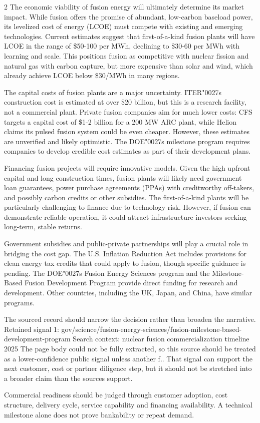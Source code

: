 \documentclass[10pt,a4paper]{article}
\newcommand{\BOApos}{{\BOQuoteFont\char"0027}}
\begin{document}
\begin{multicols}{2}
{\small The economic viability of fusion energy will ultimately determine its market impact. While fusion offers the promise of abundant, low-carbon baseload power, its levelized cost of energy (LCOE) must compete with existing and emerging technologies. Current estimates suggest that first-of-a-kind fusion plants will have LCOE in the range of \$50-100 per MWh, declining to \$30-60 per MWh with learning and scale. This positions fusion as competitive with nuclear fission and natural gas with carbon capture, but more expensive than solar and wind, which already achieve LCOE below \$30/MWh in many regions.}\par
{\small The capital costs of fusion plants are a major uncertainty. ITER\BOApos{}s construction cost is estimated at over \$20 billion, but this is a research facility, not a commercial plant. Private fusion companies aim for much lower costs: CFS targets a capital cost of \$1-2 billion for a 200 MW ARC plant, while Helion claims its pulsed fusion system could be even cheaper. However, these estimates are unverified and likely optimistic. The DOE\BOApos{}s milestone program requires companies to develop credible cost estimates as part of their development plans.}\par
{\small Financing fusion projects will require innovative models. Given the high upfront capital and long construction times, fusion plants will likely need government loan guarantees, power purchase agreements (PPAs) with creditworthy off-takers, and possibly carbon credits or other subsidies. The first-of-a-kind plants will be particularly challenging to finance due to technology risk. However, if fusion can demonstrate reliable operation, it could attract infrastructure investors seeking long-term, stable returns.}\par
{\small Government subsidies and public-private partnerships will play a crucial role in bridging the cost gap. The U.S. Inflation Reduction Act includes provisions for clean energy tax credits that could apply to fusion, though specific guidance is pending. The DOE\BOApos{}s Fusion Energy Sciences program and the Milestone-Based Fusion Development Program provide direct funding for research and development. Other countries, including the UK, Japan, and China, have similar programs.}\par
{\small The sourced record should narrow the decision rather than broaden the narrative. Retained signal 1: gov/science/fusion-energy-sciences/fusion-milestone-based-development-program Search context: nuclear fusion commercialization timeline 2025 The page body could not be fully extracted, so this source should be treated as a lower-confidence public signal unless another f.. That signal can support the next customer, cost or partner diligence step, but it should not be stretched into a broader claim than the sources support.}\par
{\small Commercial readiness should be judged through customer adoption, cost structure, delivery cycle, service capability and financing availability. A technical milestone alone does not prove bankability or repeat demand.}\par
\end{multicols}
\label{chap:2:end}
\end{document}
